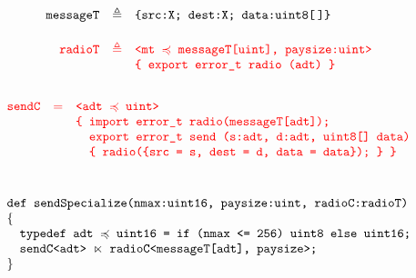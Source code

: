 $$
\begin{array}{rcl}
\texttt{messageT} &\triangleq& \texttt{\{src:X; dest:X; data:uint8[\,]\}} \\[5mm]
\texttt{\color{red}{radioT}} &\color{red}{\triangleq}& \texttt{\color{red}{<mt $\preccurlyeq$ messageT[uint], paysize:uint>}} \\
 & & \texttt{\color{red}{\{\ export\  error\_t\ radio (adt)\ \}}}\\[5mm]
\end{array} 
$$
$$
\begin{array}{lcl}
\texttt{\color{red}{sendC}} & \color{red}{=} & \texttt{\color{red}{<adt $\subtype$ uint>}}\\
&& \texttt{\color{red}{\{ import error\_t radio(messageT[adt]);}}\\
&& \texttt{\phantom{\{ }\color{red}{export error\_t send (s:adt, d:adt, uint8[] data)}}\\
&& \texttt{\phantom{\{ }\color{red}{\{ radio(\{src = s, dest = d, data = data\}); \}\ \}}}\\[10mm]
\multicolumn{3}{l}{\texttt{def sendSpecialize(nmax:uint16, paysize:uint, radioC:radioT)}}\\
\{\\
\multicolumn{3}{l}{\quad \texttt{typedef adt $\subtype$ uint16 = if (nmax <= 256) uint8 else uint16;}}\\
\multicolumn{3}{l}{\quad \texttt{sendC<adt> $\ltimes$ radioC<messageT[adt], paysize>;}}\\
\}
\end{array}
$$

\stopslide


